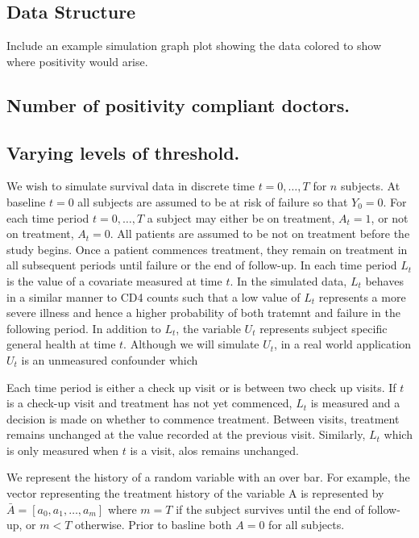 \documentclass[11pt]{article}
\begin{document}
\subsection{Data Structure}\label{data-structure}

Include an example simulation graph plot showing the data colored to
show where positivity would arise.

\subsection{Number of positivity compliant
doctors.}\label{number-of-positivity-compliant-doctors.}

\subsection{Varying levels of
threshold.}\label{varying-levels-of-threshold.}

We wish to simulate survival data in discrete time \(t = 0, \dots, T\)
for \(n\) subjects. At baseline \(t=0\) all subjects are assumed to be
at risk of failure so that \(Y_0 = 0\). For each time period
\(t = 0, \dots, T\) a subject may either be on treatment, \(A_t = 1\),
or not on treatment, \(A_t = 0\). All patients are assumed to be not on
treatment before the study begins. Once a patient commences treatment,
they remain on treatment in all subsequent periods until failure or the
end of follow-up. In each time period \(L_t\) is the value of a
covariate measured at time \(t\). In the simulated data, \(L_t\) behaves
in a similar manner to CD4 counts such that a low value of \(L_t\)
represents a more severe illness and hence a higher probability of both
tratemnt and failure in the following period. In addition to \(L_t\),
the variable \(U_t\) represents subject specific general health at time
\(t\). Although we will simulate \(U_t\), in a real world application
\(U_t\) is an unmeasured confounder which

Each time period is either a check up visit or is between two check up
visits. If \(t\) is a check-up visit and treatment has not yet
commenced, \(L_t\) is measured and a decision is made on whether to
commence treatment. Between visits, treatment remains unchanged at the
value recorded at the previous visit. Similarly, \(L_t\) which is only
measured when \(t\) is a visit, alos remains unchanged.

We represent the history of a random variable with an over bar. For
example, the vector representing the treatment history of the variable A
is represented by \(\bar A = [a_0, a_1, \dots, a_m]\) where \(m=T\) if
the subject survives until the end of follow-up, or \(m < T\) otherwise.
Prior to basline both \(A = 0\) for all subjects.
\end{document}
